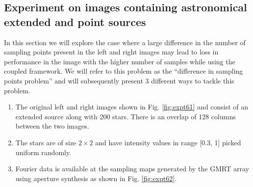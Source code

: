 \subsection{Experiment on images containing astronomical extended and point sources}
In this section we will explore the case where a large difference in the number of sampling points present in the left and right images may lead to loss in performance in the image with the higher number of samples while using the coupled framework.
We will refer to this problem as the ``difference in sampling points problem'' and will subsequently present 3 different ways to tackle this problem.
\begin{enumerate}
\item The original left and right images shown in Fig. \ref{fig:expt61} and consist of an extended source along with 200 stars.
There is an overlap of 128 columns between the two images.
\item The stars are of size $2 \times 2$ and have intensity values in range [0.3, 1] picked uniform randomly.
\item Fourier data is available at the sampling maps generated by the GMRT array using aperture synthesis as shown in Fig. \ref{fig:expt62}.


\end{enumerate}
